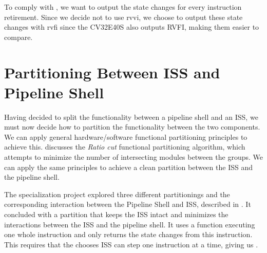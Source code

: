 To comply with , we want to output the state changes for every instruction retirement. Since we decide not to use \acrshort{rvvi}, we choose to output these state changes with \acrshort{rvfi} since the CV32E40S also outputs RVFI, making them easier to compare.

%


\section{Partitioning Between ISS and Pipeline Shell}

Having decided to split the functionality between a pipeline shell and an ISS, we must now decide how to partition the functionality between the two components. We can apply general hardware/software functional partitioning principles to achieve this. 
\textcite{gajskiSpecificationDesignEmbedded1994} discusses the \textit{Ratio cut} functional partitioning algorithm, which attempts to minimize the number of intersecting modules between the groups. We can apply the same principles to achieve a clean partition between the ISS and the pipeline shell.

The specialization project explored three different partitionings and the corresponding interaction between the Pipeline Shell and ISS, described in . It concluded with a partition that keeps the ISS intact and minimizes the interactions between the ISS and the pipeline shell. It uses a  function executing one whole instruction and only returns the state changes from this instruction. This requires that the chooses ISS can step one instruction at a time, giving us .

